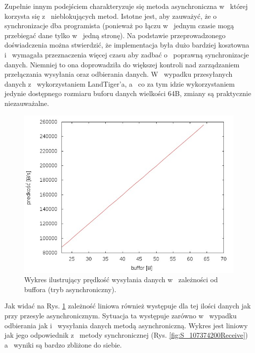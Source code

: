 \documentclass{BscUS}
\begin{document}
\newline
\indent Zupełnie innym podejściem charakteryzuje się metoda asynchroniczna w~ której korzysta się z~ nieblokujących metod. Istotne jest, aby zauważyć, że o~ synchronizacje dba programista (ponieważ po łączu w~ jednym czasie mogą przebiegać dane tylko w~ jedną stronę). Na podstawie przeprowadzonego doświadczenia można stwierdzić, że implementacja była dużo bardziej kosztowna i~ wymagała przeznaczenia więcej czasu aby zadbać o~ poprawną synchronizacje danych. Niemniej to ona doprowadziła do większej kontroli nad zarządzaniem przełączania wysyłania oraz odbierania danych. W~ wypadku przesyłanych danych z~ wykorzystaniem LandTiger'a, a~ co za tym idzie wykorzystaniem jedynie dostępnego rozmiaru buforu danych wielkości 64B, zmiany są praktycznie niezauważalne.
\begin{figure}[H]
{
\centering
\includegraphics[width=1\textwidth]{./img/A_107374200Receive}
\caption{Wykres ilustrujący prędkość wysyłania danych w~ zależności od buffora (tryb asynchroniczny).}
\label{fig:A_107374200Receive}
}

\end{figure}

\noindent Jak widać na Rys. \ref{fig:A_107374200Receive} zależność liniowa również występuje dla tej ilości danych jak przy przesyle asynchronicznym. Sytuacja ta występuje zarówno w~ wypadku odbierania jak i~ wysyłania danych metodą asynchroniczną. Wykres jest liniowy jak jego odpowiednik z~ metody synchronicznej (Rys. \ref{fig:S_107374200Receive}) a~ wyniki są bardzo zbliżone do siebie.
\end{document}
